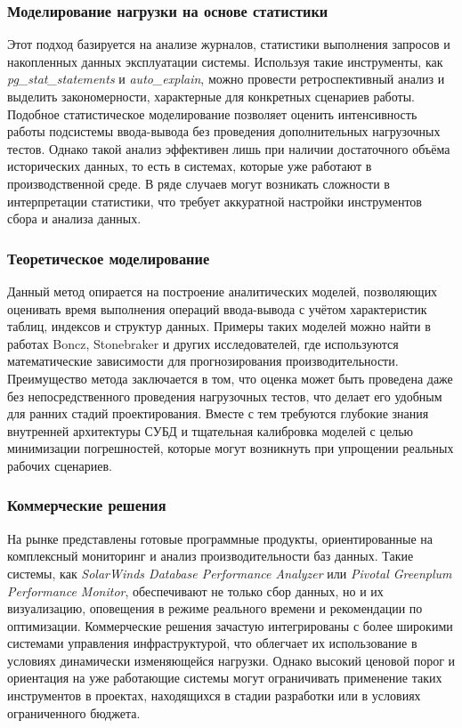 \subsubsection{Моделирование нагрузки на основе статистики}
Этот подход базируется на анализе журналов, статистики выполнения запросов и накопленных данных эксплуатации системы. Используя такие инструменты, как \textit{pg\_stat\_statements} и \textit{auto\_explain}, можно провести ретроспективный анализ и выделить закономерности, характерные для конкретных сценариев работы. Подобное статистическое моделирование позволяет оценить интенсивность работы подсистемы ввода-вывода без проведения дополнительных нагрузочных тестов. Однако такой анализ эффективен лишь при наличии достаточного объёма исторических данных, то есть в системах, которые уже работают в производственной среде. В ряде случаев могут возникать сложности в интерпретации статистики, что требует аккуратной настройки инструментов сбора и анализа данных.

\subsubsection{Теоретическое моделирование}
Данный метод опирается на построение аналитических моделей, позволяющих оценивать время выполнения операций ввода-вывода с учётом характеристик таблиц, индексов и структур данных. Примеры таких моделей можно найти в работах Boncz, Stonebraker и других исследователей, где используются математические зависимости для прогнозирования производительности. Преимущество метода заключается в том, что оценка может быть проведена даже без непосредственного проведения нагрузочных тестов, что делает его удобным для ранних стадий проектирования. Вместе с тем требуются глубокие знания внутренней архитектуры СУБД и тщательная калибровка моделей с целью минимизации погрешностей, которые могут возникнуть при упрощении реальных рабочих сценариев.

\subsubsection{Коммерческие решения}
На рынке представлены готовые программные продукты, ориентированные на комплексный мониторинг и анализ производительности баз данных. Такие системы, как \textit{SolarWinds Database Performance Analyzer} или \textit{Pivotal Greenplum Performance Monitor}, обеспечивают не только сбор данных, но и их визуализацию, оповещения в режиме реального времени и рекомендации по оптимизации. Коммерческие решения зачастую интегрированы с более широкими системами управления инфраструктурой, что облегчает их использование в условиях динамически изменяющейся нагрузки. Однако высокий ценовой порог и ориентация на уже работающие системы могут ограничивать применение таких инструментов в проектах, находящихся в стадии разработки или в условиях ограниченного бюджета.

